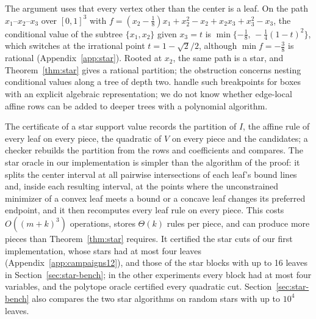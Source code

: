 \begin{remark}\label{rem:trees}
The argument uses that every vertex other than the center is a leaf. On the
path $x_1$--$x_2$--$x_3$ over $[0,1]^3$ with
$f=(x_2-\tfrac18)x_1+x_2^2-x_2+x_2x_3+x_3^2-x_3$, the conditional value of the
subtree $\{x_1,x_2\}$ given $x_3=t$ is
$\min\{-\tfrac18,\,-\tfrac14(1-t)^2\}$, which switches at the irrational point
$t=1-\sqrt2/2$, although $\min f=-\tfrac38$ is rational
(Appendix~\ref{app:star}). Rooted at $x_2$, the same path is a star, and
Theorem~\ref{thm:star} gives a rational partition; the obstruction concerns
nesting conditional values along a tree of depth two.
\citeauthor{DelPiaKhajavirad2026} handle such breakpoints for boxes with an
explicit algebraic representation; we do not know whether edge-local affine
rows can be added to deeper trees with a polynomial algorithm.
\end{remark}

The certificate of a star support value records the partition of $I$, the
affine rule of every leaf on every piece, the quadratic of $V$ on every piece
and the candidates; a checker rebuilds the partition from the rows and
coefficients and compares. The star oracle in our implementation is simpler
than the algorithm of the proof: it splits the center interval at all
pairwise intersections of each leaf's bound lines and, inside each resulting
interval, at the points where the unconstrained minimizer of a convex leaf
meets a bound or a concave leaf changes its preferred endpoint, and it then
recomputes every leaf rule on every piece. This costs $O((m+k)^3)$ operations,
stores $\Theta(k)$ rules per piece, and can produce more pieces than
Theorem~\ref{thm:star} requires. It certified the star cuts of our first
implementation, whose stars had at most four leaves
(Appendix~\ref{app:campaigns12}), and those of the star blocks with up to 16
leaves in Section~\ref{sec:star-bench}; in the other experiments every block
had at most four variables, and the polytope oracle certified every quadratic
cut. Section~\ref{sec:star-bench} also compares the two star algorithms on
random stars with up to $10^4$ leaves.

